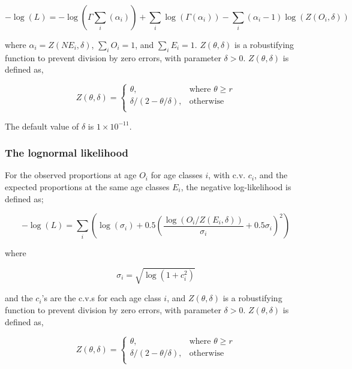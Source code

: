 {{{{\begin{equation}
-\log \left(L \right) = -\log(\Gamma \sum\limits_i (\alpha_i)) + \sum\limits_i \log(\Gamma (\alpha_i)) - \sum\limits_i (\alpha_i-1) \log(Z(O_i,\delta))
\end{equation}

where $\alpha_i = Z \left(N E_i,\delta \right)$, $\sum\limits_i O_i = 1$, and $\sum\limits_i E_i = 1$. $Z \left(\theta,\delta \right)$ is a robustifying function to prevent division by zero errors, with parameter $\delta>0$. $Z \left(\theta,\delta \right)$ is defined as,

\begin{equation}
Z \left(\theta,\delta \right) = \begin{cases}
\theta, & \text{where $\theta \ge r$} \\
\delta/\left( 2-\theta/\delta \right), & \text{otherwise} \\  
\end{cases}
\end{equation}

The default value of $\delta$ is $1 \times 10^{-11}$.

\subsubsection*{The lognormal likelihood}

For the observed proportions at age $O_i$ for age classes $i$, with c.v. $c_i$, and the expected proportions at the same age classes $E_i$, the negative log-likelihood is defined as; 

\begin{equation}
- \log \left(L \right) = \sum\limits_i \left( \log \left( \sigma _i \right) + 0.5\left( \frac{\log \left(O_i / Z \left(E_i,\delta \right) \right)}{\sigma_i} + 0.5 \sigma_i \right)^2 \right)
\end{equation}

where 

\begin{equation}
\sigma_i  = \sqrt{\log \left(1+c_i^2 \right)}
\end{equation}

and the $c_i$'s are the c.v.s for each age class $i$, and $Z \left(\theta,\delta \right)$ is a robustifying function to prevent division by zero errors, with parameter $\delta>0$. $Z \left(\theta,\delta \right)$ is defined as,

\begin{equation}
Z \left(\theta,\delta \right) = \begin{cases}
\theta, & \text{where $\theta \ge r$} \\
\delta/\left( 2-\theta/\delta \right), & \text{otherwise} \\  
\end{cases}
\end{equation}

}}}}
